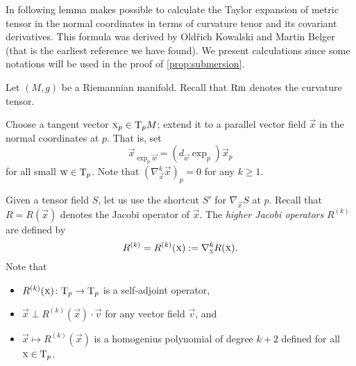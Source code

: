 \documentclass[a4paper,10pt]{article}
\begin{document}
In following lemma makes possible to calculate the Taylor expansion of metric tensor in the normal coordinates in terms of curvature tenor and its covariant derivatives.
This formula was derived by Old\v{r}ich Kowalski and Martin Belger \cite[Proposition 2.2]{kowalski-belger} (that is the earliest reference we have found).
We present calculations since some notations will be used in the proof of \ref{prop:submersion}.

Let $(M,g)$ be a Riemannian manifold.
Recall that $\operatorname{\rm Rm}$ denotes the curvature tensor.

Choose a tangent vector $\text{\sc{x}}_p\in \mathrm{T}_pM$; 
extend it to a parallel vector field $\vec{x}$ in the normal coordinates at $p$.
That is, set 
\[\vec{x}_{\exp_p\vec{w}}=(d_\vec{w}\exp_p)\vec{x}_p\] for all small $\text{\sc{w}}\in \mathrm{T}_p$.
Note that $(\nabla^k_\vec{x} \vec{x})_p=0$ for any $k\ge 1$.

Given a tensor field $S$, let us use the shortcut $S'$ for $\nabla_\vec{x}S$ at $p$.
Recall that $R=R(\vec{x})$ denotes the Jacobi operator of $\vec{x}$.
The \emph{higher Jacobi operators} $R^{(k)}$ are defined by
\[R^{(k)}=R^{(k)}(\text{\sc{x}})\mathrel{{:}{=}}\nabla^k_{\text{\sc{x}}}R(\text{\sc{x}}).\]
Note that 
\begin{itemize}
\item $R^{(k)}(\text{\sc{x}})\colon\mathrm{T}_p\to\mathrm{T}_p$ is a self-adjoint operator, 
\item $\vec{x}\perp R^{(k)}(\vec{x})\cdot \vec{v}$ for any vector field $\vec{v}$, and
\item $\vec{x}\mapsto R^{(k)}(\vec{x})$ is a homogenius polynomial of degree $k+2$ defined for all $\text{\sc{x}}\in \mathrm{T}_p$.
\end{itemize}
\end{document}
